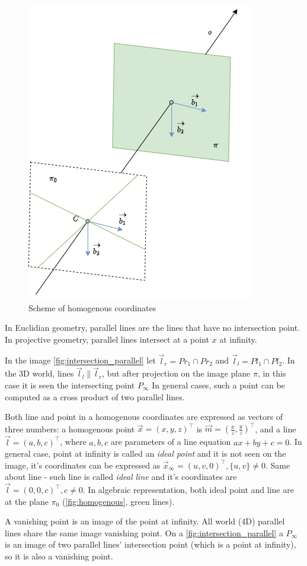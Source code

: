 \begin{figure}[h]
    \centering
    \includegraphics[width=.5\textwidth]{graphics/homogenous.png}
    \caption{Scheme of homogenous coordinates}
    \label{fig:homogenous}
\end{figure}

In Euclidian geometry, parallel lines are the lines that have no intersection point. 
In projective geometry, parallel lines intersect at a point $x$ at infinity. 

In the image \autoref{fig:intersection_parallel} let $\vec{l}_r = Pr_1 \cap Pr_2 $ and $\vec{l}_l = Pl_1 \cap Pl_2$. 
In the 3D world, lines $\vec{l}_l \parallel \vec{l}_r$, but after projection on the image plane $\pi$, in this case it is seen the intersecting point $P_{\infty}$
In general cases, such a point can be computed as a cross product of two parallel lines. 

Both line and point in a homogenous coordinates are expressed as vectors of three numbers: a homogenous point $\vec{x} = (x, y, z)^\top$ is $\vec{m} = (\frac{x}{z}, \frac{y}{z})^\top$, and a line $\vec{l} = (a, b, c)^\top$, where $a, b, c$ are parameters of a line equation $ax + by + c = 0$. 
In general case, point at infinity is called an \textit{ideal point} and it is not seen on the image, it's coordinates can be expressed as $\vec{x}_{\infty} = (u, v, 0)^\top, \{u, v\} \neq 0$.
Same about line - such line is called \textit{ideal line} and it's coordinates are $\vec{l} = (0, 0, c)^\top, c \neq 0$. In algebraic representation, both ideal point and line are at the plane $\pi_0$ (\autoref{fig:homogenous}, green lines).

A vanishing point is an image of the point at infinity.
All world (4D) parallel lines share the same image vanishing point. On a \autoref{fig:intersection_parallel} a $P_{\infty}$ is an image of two parallel lines' intersection point (which is a point at infinity), so it is also a vanishing point.

